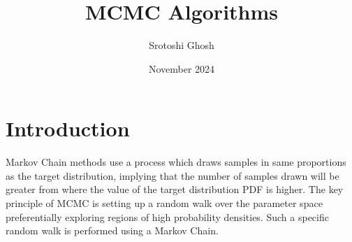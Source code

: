 \documentclass{article}
\title{MCMC Algorithms}
\author{Srotoshi Ghosh}
\date{November 2024}
\begin{document}
\maketitle

\section{Introduction}
 Markov Chain methods use a process which draws samples in same proportions as the target distribution, implying that the number of samples drawn will be greater from where the value of the target distribution PDF is higher. The key principle of MCMC is setting up a random walk over the parameter space preferentially exploring regions of high probability densities. Such a specific random walk is performed using a Markov Chain. 
\end{document}
